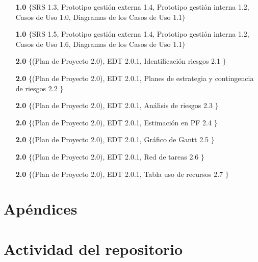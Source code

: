 \documentclass[11pt, a4paper, twoside]{report}
\begin{document}
		\begin{itemize}
			\item[\bfseries 1.0] $\{$SRS 1.3, Prototipo gestión externa 1.4, Prototipo gestión interna 1.2, Casos de Uso 1.0, Diagramas de los Casos de Uso 1.1$\}$
			\item[\bfseries 1.0] $\{$SRS 1.5, Prototipo gestión externa 1.4, Prototipo gestión interna 1.2, Casos de Uso 1.6, Diagramas de los Casos de Uso 1.1$\}$
			\item[\bfseries 2.0] $\{$(Plan de Proyecto 2.0), EDT 2.0.1, Identificación riesgos 2.1 $\}$
			\item[\bfseries 2.0] $\{$(Plan de Proyecto 2.0), EDT 2.0.1, Planes de estrategia y contingencia de riesgos 2.2 $\}$
			\item[\bfseries 2.0] $\{$(Plan de Proyecto 2.0), EDT 2.0.1, Análisis de riesgos 2.3 $\}$
			\item[\bfseries 2.0] $\{$(Plan de Proyecto 2.0), EDT 2.0.1, Estimación en PF 2.4 $\}$
			\item[\bfseries 2.0] $\{$(Plan de Proyecto 2.0), EDT 2.0.1, Gráfico de Gantt 2.5 $\}$
			\item[\bfseries 2.0] $\{$(Plan de Proyecto 2.0), EDT 2.0.1, Red de tareas 2.6 $\}$
			\item[\bfseries 2.0] $\{$(Plan de Proyecto 2.0), EDT 2.0.1, Tabla uso de recursos 2.7 $\}$
		\end{itemize}
		
	\newpage
	\section{Apéndices}
		\appendix
		\section{Actividad del repositorio}
			
		
		\newpage
		\normalsize
		\nocite{PSMAN}
		
		
\end{document}
